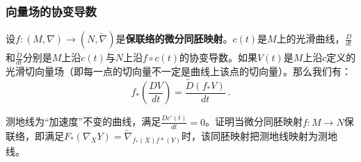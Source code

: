 \subsubsection{向量场的协变导数}
设$f:(M,\nabla)\rightarrow(N,\widetilde {\nabla})$是\textbf{保联络的微分同胚映射}。$c(t)$是$M$上的光滑曲线，$\frac{D}{dt}$和$\frac{\widetilde D}{dt}$分别是$M$上沿$c(t)$与$N$上沿$f\circ  c(t)$的协变导数。如果$V(t)$是$M$上沿$c$定义的光滑切向量场（即每一点的切向量不一定是曲线上该点的切向量）。那么我们有：
\begin{equation}
f_*(\frac{DV}{dt})=\frac{\widetilde D(f_*V)}{dt}~.
\end{equation}
\begin{exercise}{}
测地线为“加速度”不变的曲线，满足$\frac{Dc'(t)}{dt}=0$。证明当微分同胚映射$f:M\rightarrow N$保联络，即满足$F_*(\nabla_X Y)=\widetilde \nabla_{f_*(X)f*(Y)}$时，该同胚映射把测地线映射为测地线。
\end{exercise}